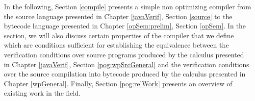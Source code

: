 In the following, Section \ref{compile} presents a simple non optimizing compiler from the source language presented in Chapter \ref{javaVerif}, Section \ref{source}
 to the bytecode language presented in Chapter \ref{opSem:prelim}, Section \ref{opSem}. In the section, we will also discuss certain properties of the 
compiler that we define which are  conditions sufficient for establishing the equivalence between the verification conditions over  source programs produced
by the calculus presented in Chapter  \ref{javaVerif},  Section \ref{pog:wpSrcGeneral} and 
the verification conditions over the source compilation into bytecode produced by the calculus presented in Chapter \ref{wpGeneral}.
 Finally, Section \ref{pog:relWork} presents an overview of existing work in the field.







